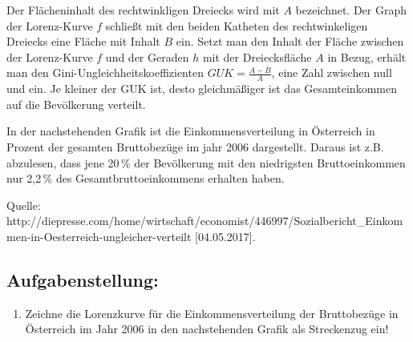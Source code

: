 \begin{langesbeispiel}
Der Flächeninhalt des rechtwinkligen Dreiecks wird mit $A$ bezeichnet. Der Graph der Lorenz-Kurve $f$ schließt mit den beiden Katheten des rechtwinkeligen Dreiecks eine Fläche mit Inhalt $B$ ein. Setzt man den Inhalt der Fläche zwischen der Lorenz-Kurve $f$ und der Geraden $h$ mit der Dreiecksfläche $A$ in Bezug, erhält man den Gini-Ungleichheitskoeffizienten $GUK=\frac{A-B}{A}$, eine Zahl zwischen null und ein. Je kleiner der GUK ist, desto gleichmäßiger ist das Gesamteinkommen auf die Bevölkerung verteilt.\leer

In der nachstehenden Grafik ist die Einkommensverteilung in Österreich in Prozent der gesamten Bruttobezüge im jahr 2006 dargestellt. Daraus ist z.B. abzulesen, dass jene 20\,\% der Bevölkerung mit den niedrigsten Bruttoeinkommen nur 2,2\,\% des Gesamtbruttoeinkommens erhalten haben.

\begin{center}
\end{center}

\begin{scriptsize}\begin{singlespace}Quelle: http://diepresse.com/home/wirtschaft/economist/446997/Sozialbericht\_Einkommen-in-Oesterreich-ungleicher-verteilt [04.05.2017].\end{singlespace}\end{scriptsize}

\subsection{Aufgabenstellung:}
\begin{enumerate}
	\item Zeichne die Lorenzkurve für die Einkommensverteilung der Bruttobezüge in Österreich im Jahr 2006 in den nachstehenden Grafik als Streckenzug ein!
	

\end{enumerate}
\end{langesbeispiel}

